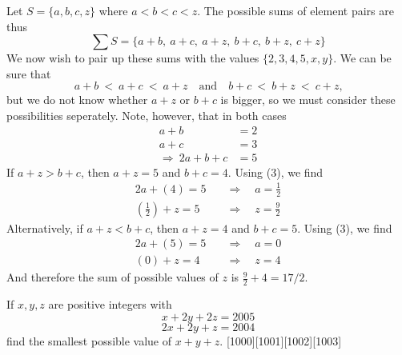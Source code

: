 \documentclass[12pt]{article}
\newcounter{problem}
\begin{document}
\begin{solution}[A]
   Let $S=\{a,b,c,z\}$ where $a<b<c<z$. The possible sums of element pairs are thus
    \[{\textstyle\sum} S=\{a+b,\ a+c,\ a+z,\ b+c,\ b+z,\ c+z\}\]
    We now wish to pair up these sums with the values $\{2, 3, 4, 5, x, y\}$. We can be sure that \[a+b\ <\ a+c\ <\ a+z \quad \text{and}\quad b+c\ <\ b+z\ <\ c+z\text{,}\]but we do not know whether $a+z$ or $b+c$ is bigger, so we must consider these possibilities seperately. Note, however, that in both cases
    \begin{align}
        a+b &= 2 \\
        a+c &= 3 \\
        \Rightarrow\ 2a+b+c &= 5
    \end{align}
    If $a+z > b+c$, then $a+z = 5$ and $b+c = 4$. Using (3), we find
    \begin{align*}
        2a+(4) = 5 \quad &\Rightarrow \quad a=\frac{1}{2} \\[2mm]
        \left(\frac{1}{2}\right) + z = 5 \quad &\Rightarrow \quad z=\frac{9}{2}
    \end{align*}
    Alternatively, if $a+z < b+c$, then $a+z = 4$ and $b+c = 5$. Using (3), we find
    \begin{align*}
        2a + (5) = 5 \quad &\Rightarrow \quad a=0 \\[2mm]
        (0) + z = 4 \quad &\Rightarrow \quad z=4
    \end{align*}
    And therefore the sum of possible values of $z$ is $\frac{9}{2} + 4 = \boxed{17/2}$.
\end{solution}

\begin{problem}
   If $x,y,z$ are positive integers with 
    $$x + 2y + 2z = 2005$$ 
    $$2x + 2y + z = 2004$$ 
    find the smallest possible value of $x + y + z$.
    [1000][1001][1002][1003]
\end{problem}
\end{document}
